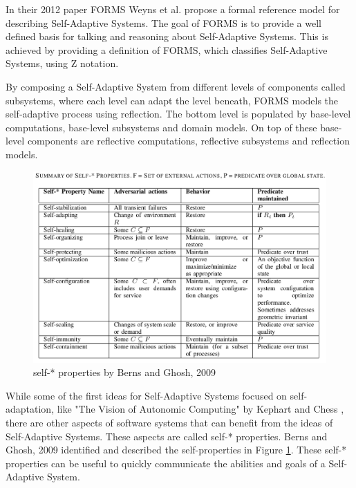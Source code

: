 \par
In their 2012 paper FORMS \cite{FORMS} Weyns et al. propose a formal reference model for describing Self-Adaptive Systems.
The goal of FORMS is to provide a well defined basis for talking and reasoning about Self-Adaptive Systems.
This is achieved by providing a definition of FORMS, which classifies Self-Adaptive Systems, using Z notation.
\par
By composing a Self-Adaptive System from different levels of components called subsystems,
where each level can adapt the level beneath, FORMS models the self-adaptive process using reflection.
The bottom level is populated by base-level computations, base-level subsystems and domain models.
On top of these base-level components are reflective computations, reflective subsystems and reflection models.

\begin{figure}[hbt!]
    \includegraphics[width=\textwidth]{images/SelfProperties.png}
    \caption{self-* properties by Berns and Ghosh, 2009 \cite*{DissectingSelfProperties}}
    \label{fig:SelfProperties}
\end{figure}

While some of the first ideas for Self-Adaptive Systems focused on self-adaptation, 
like "The Vision of Autonomic Computing" by Kephart and Chess \cite*{VisionOfAutonomicComputing},
there are other aspects of software systems that can benefit from the ideas of Self-Adaptive Systems.
These aspects are called self-* properties.
Berns and Ghosh, 2009 \cite*{DissectingSelfProperties} identified and described the self-properties in Figure \ref{fig:SelfProperties}.
These self-* properties can be useful to quickly communicate the abilities and goals of a Self-Adaptive System.

